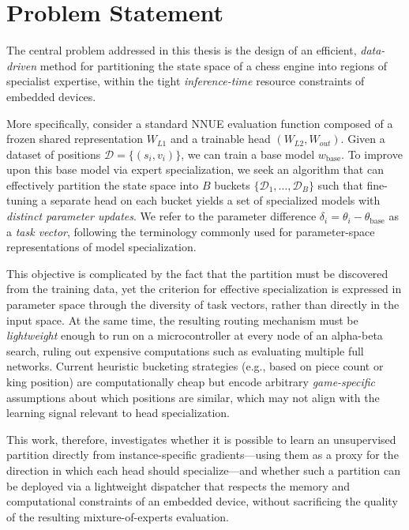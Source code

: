 \section{Problem Statement}

The central problem addressed in this thesis is the design of an efficient, \emph{data-driven} method for partitioning the state space of a chess engine into regions of specialist expertise, within the tight \emph{inference-time} resource constraints of embedded devices.

More specifically, consider a standard NNUE evaluation function composed of a frozen shared representation $W_{L1}$ and a trainable head $(W_{L2}, W_{out})$. Given a dataset of positions $\mathcal{D} = \{(s_i, v_i)\}$, we can train a base model $w_{\text{base}}$. To improve upon this base model via expert specialization, we seek an algorithm that can effectively partition the state space into $B$ buckets $\{\mathcal{D}_1, \dots, \mathcal{D}_B\}$ such that fine-tuning a separate head on each bucket yields a set of specialized models with \emph{distinct parameter updates}. We refer to the parameter difference $\delta_i = \theta_i-\theta_{\mathrm{base}}$ as a \emph{task vector}, following the terminology commonly used for parameter-space representations of model specialization.

This objective is complicated by the fact that the partition must be discovered from the training data, yet the criterion for effective specialization is expressed in parameter space through the diversity of task vectors, rather than directly in the input space. At the same time, the resulting routing mechanism must be \emph{lightweight} enough to run on a microcontroller at every node of an alpha-beta search, ruling out expensive computations such as evaluating multiple full networks. Current heuristic bucketing strategies (e.g., based on piece count or king position) are computationally cheap but encode arbitrary \emph{game-specific} assumptions about which positions are similar, which may not align with the learning signal relevant to head specialization.

This work, therefore, investigates whether it is possible to learn an unsupervised partition directly from instance-specific gradients---using them as a proxy for the direction in which each head should specialize---and whether such a partition can be deployed via a lightweight dispatcher that respects the memory and computational constraints of an embedded device, without sacrificing the quality of the resulting mixture-of-experts evaluation.


